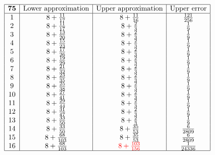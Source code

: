 \documentclass{amsart}
\begin{document}
\vspace*{-0.5cm}
$$\begin{array}{|c|c|c|c|}
 \hline
 {\bf 75}&\text{Lower approximation}&\text{Upper approximation}&\text{Upper error}\\
 \hline
 1&8+\frac{11}{17}&8+\frac{11}{16}&\frac{121}{256}\\
2&8+\frac{11}{17}&8+\frac{2}{3}&\frac{1}{9}\\
3&8+\frac{13}{20}&8+\frac{2}{3}&\frac{1}{9}\\
4&8+\frac{15}{23}&8+\frac{2}{3}&\frac{1}{9}\\
5&8+\frac{17}{26}&8+\frac{2}{3}&\frac{1}{9}\\
6&8+\frac{19}{29}&8+\frac{2}{3}&\frac{1}{9}\\
7&8+\frac{21}{32}&8+\frac{2}{3}&\frac{1}{9}\\
8&8+\frac{23}{35}&8+\frac{2}{3}&\frac{1}{9}\\
9&8+\frac{25}{38}&8+\frac{2}{3}&\frac{1}{9}\\
10&8+\frac{27}{41}&8+\frac{2}{3}&\frac{1}{9}\\
11&8+\frac{29}{44}&8+\frac{2}{3}&\frac{1}{9}\\
12&8+\frac{31}{47}&8+\frac{2}{3}&\frac{1}{9}\\
13&8+\frac{33}{50}&8+\frac{2}{3}&\frac{1}{9}\\
14&8+\frac{33}{50}&8+\frac{35}{53}&\frac{6}{2809}\\
15&8+\frac{68}{103}&8+\frac{35}{53}&\frac{6}{2809}\\
16&8+\frac{68}{103}&{\color{red}8+\frac{103}{156}}&\frac{1}{24336}\\
 \hline
\end{array}$$
\end{document}
